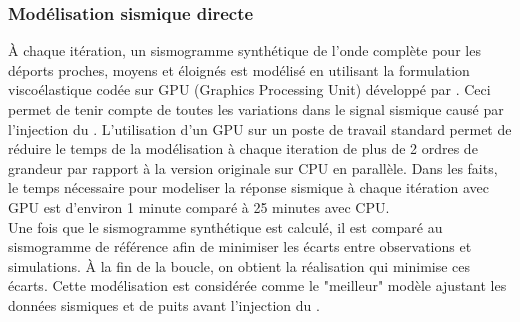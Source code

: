 \subsubsection{Modélisation sismique directe}
À chaque itération, un sismogramme synthétique de l'onde complète pour les
déports proches, moyens et éloignés est modélisé en utilisant la formulation
viscoélastique  \citep{Bohlen2002} codée sur GPU (Graphics
Processing Unit) développé par \citet{Gab2014}. Ceci permet de tenir compte de
toutes les variations dans le signal sismique causé par l'injection du .
L'utilisation d'un GPU sur un poste de travail standard permet de réduire le
temps de la modélisation à chaque iteration de plus de 2 ordres de grandeur par
rapport à la version originale sur CPU en parallèle. Dans les faits, le temps
nécessaire pour modeliser la réponse sismique à chaque itération avec GPU est
d'environ \num{1} minute comparé à \num{25} minutes avec CPU.\\
Une fois que le sismogramme synthétique est calculé, il est comparé au sismogramme de référence afin de
minimiser les écarts entre observations et simulations. À la fin de la boucle,
on obtient la réalisation qui minimise ces écarts. Cette modélisation est considérée comme le "meilleur" modèle ajustant les données sismiques et de puits avant l'injection du .
